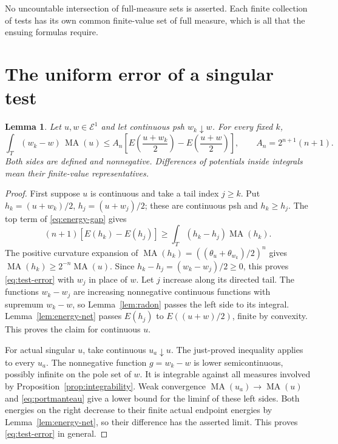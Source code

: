 \documentclass[11pt]{article}
\newtheorem{lemma}[theorem]{Lemma}
\newcommand{\MA}{\operatorname{MA}}
\newcommand{\E}{\mathcal E}
\begin{document}
No uncountable intersection of full-measure sets is asserted. Each
finite collection of tests has its own common finite-value set of
full measure, which is all that the ensuing formulas require.

\section{The uniform error of a singular test}

\begin{lemma}\label{lem:test-error}
Let $u,w\in\E^1$ and let continuous psh $w_k\downarrow w$.
For every fixed $k$,
\begin{equation}\label{eq:test-error}
 \int_T(w_k-w)\,\MA(u)
 \leq A_n\left[
 E\left(\frac{u+w_k}{2}\right)
       -E\left(\frac{u+w}{2}\right)\right],
 \qquad A_n=2^{n+1}(n+1).
\end{equation}
Both sides are defined and nonnegative. Differences of potentials
inside integrals mean their finite-value representatives.
\end{lemma}
\begin{proof}
First suppose $u$ is continuous and take a tail index $j\geq k$.
Put $h_k=(u+w_k)/2$, $h_j=(u+w_j)/2$; these are continuous psh
and $h_k\geq h_j$. The top term of \eqref{eq:energy-gap} gives
\[
 (n+1)[E(h_k)-E(h_j)]
       \geq\int_T(h_k-h_j)\MA(h_k).
\]
The positive curvature expansion of
$\MA(h_k)=((\theta_u+\theta_{w_k})/2)^n$
gives $\MA(h_k)\geq2^{-n}\MA(u)$. Since
$h_k-h_j=(w_k-w_j)/2\geq0$, this proves
\eqref{eq:test-error} with $w_j$ in place of $w$.
Let $j$ increase along its directed tail. The functions $w_k-w_j$
are increasing nonnegative continuous functions with supremum
$w_k-w$, so Lemma~\ref{lem:radon} passes the left side to its
integral. Lemma~\ref{lem:energy-net} passes $E(h_j)$ to
$E((u+w)/2)$, finite by convexity. This proves the claim for
continuous $u$.

For actual singular $u$, take continuous $u_a\downarrow u$.
The just-proved inequality applies to every $u_a$. The nonnegative
function $g=w_k-w$ is lower semicontinuous, possibly infinite on
the pole set of $w$. It is integrable against all measures involved
by Proposition~\ref{prop:integrability}. Weak convergence
$\MA(u_a)\to\MA(u)$ and \eqref{eq:portmanteau} give a lower bound
for the liminf of these left sides. Both energies on the right
decrease to their finite actual endpoint energies by
Lemma~\ref{lem:energy-net}, so their difference has the asserted
limit. This proves \eqref{eq:test-error} in general.
\end{proof}
\end{document}
